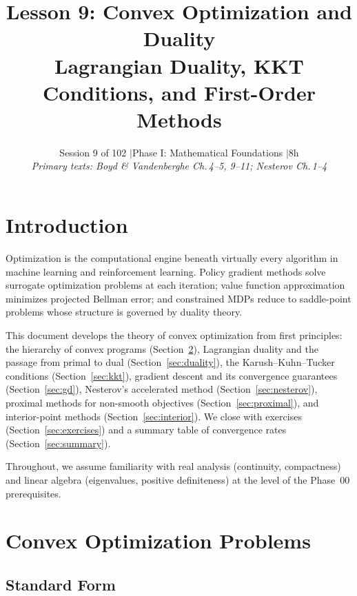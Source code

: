 \documentclass[11pt,a4paper]{article}
\title{%
  \textbf{Lesson 9: Convex Optimization and Duality} \\[6pt]
  \large Lagrangian Duality, KKT Conditions, and First-Order Methods
}
\author{%
  Session 9 of 102 \quad$\mid$\quad Phase I: Mathematical Foundations \quad$\mid$\quad 8h \\[4pt]
  \textit{Primary texts: Boyd \& Vandenberghe Ch.\,4--5, 9--11; Nesterov Ch.\,1--4}
}
\date{}
\theoremstyle{definition}
\theoremstyle{plain}
\theoremstyle{remark}
\begin{document}
\maketitle
\thispagestyle{fancy}
\tableofcontents
\newpage

\section{Introduction}\label{sec:intro}

Optimization is the computational engine beneath virtually every algorithm in
machine learning and reinforcement learning. Policy gradient methods solve
surrogate optimization problems at each iteration; value function approximation
minimizes projected Bellman error; and constrained MDPs reduce to saddle-point
problems whose structure is governed by duality theory.

This document develops the theory of convex optimization from first principles:
the hierarchy of convex programs (Section~\ref{sec:convex-problems}), Lagrangian
duality and the passage from primal to dual (Section~\ref{sec:duality}), the
Karush--Kuhn--Tucker conditions (Section~\ref{sec:kkt}), gradient descent and
its convergence guarantees (Section~\ref{sec:gd}), Nesterov's accelerated method
(Section~\ref{sec:nesterov}), proximal methods for non-smooth objectives
(Section~\ref{sec:proximal}), and interior-point methods
(Section~\ref{sec:interior}). We close with exercises
(Section~\ref{sec:exercises}) and a summary table of convergence rates
(Section~\ref{sec:summary}).

Throughout, we assume familiarity with real analysis (continuity, compactness)
and linear algebra (eigenvalues, positive definiteness) at the level of the
Phase~00 prerequisites.

\section{Convex Optimization Problems}\label{sec:convex-problems}

\subsection{Standard Form}
\end{document}

